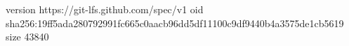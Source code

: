 version https://git-lfs.github.com/spec/v1
oid sha256:19ff5ada280792991fc665c0aacb96dd5df11100c9df9440b4a3575de1cb5619
size 43840
